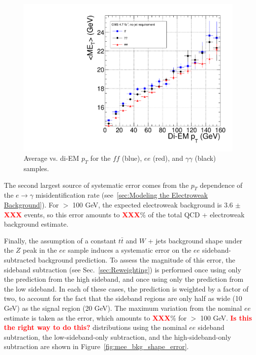 \documentclass[dissertation.tex]{subfiles}
\begin{document}
\begin{figure}
	\centering
	\includegraphics[scale=0.4]{avg_MET_vs_di-EM_pT}
	\caption{Average \MET vs. di-EM $p_{T}$ for the $\mathit{ff}$ (blue), $ee$ (red), and $\gamma\gamma$ (black) samples.}
	\label{fig:avg_MET_vs_di-EM_pT}
\end{figure}

The second largest source of systematic error comes from the $p_{T}$ dependence of the $e\rightarrow\gamma$ misidentification rate (see~\ref{sec:Modeling the Electroweak Background}).  For \MET $>$ 100 GeV, the expected electroweak background is 3.6 $\pm$ \textcolor{red}{\textbf{XXX}} events, so this error amounts to \textcolor{red}{\textbf{XXX}}\% of the total QCD + electroweak background estimate.

Finally, the assumption of a constant $t\bar{t}$ and $W$ + jets background shape under the $Z$ peak in the $ee$ sample induces a systematic error on the $ee$ sideband-subtracted background prediction.  To assess the magnitude of this error, the sideband subtraction (see Sec.~\ref{sec:Reweighting}) is performed once using only the prediction from the high sideband, and once using only the prediction from the low sideband.  In each of these cases, the prediction is weighted by a factor of two, to account for the fact that the sideband regions are only half as wide (10 GeV) as the signal region (20 GeV).  The maximum variation from the nominal $ee$ estimate is taken as the error, which amounts to \textcolor{red}{\textbf{XXX}}\% for \MET $>$ 100 GeV.  \textcolor{red}{\textbf{Is this the right way to do this?}}  \MET distributions using the nominal $ee$ sideband subtraction, the low-sideband-only subtraction, and the high-sideband-only subtraction are shown in Figure~\ref{fig:mee_bkg_shape_error}.
\end{document}
